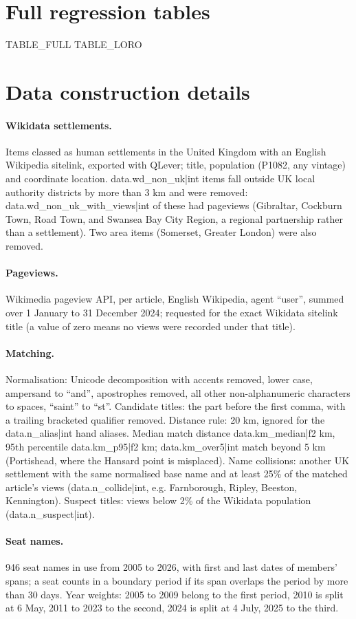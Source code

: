 \documentclass[11pt,a4paper]{article}
\begin{document}
\appendix
\section{Full regression tables}
{{TABLE_FULL}}
{{TABLE_LORO}}
\section{Data construction details}
\label{app:data}
\paragraph{Wikidata settlements.} Items classed as human settlements in the United Kingdom with an English Wikipedia sitelink, exported with QLever; title, population (P1082, any vintage) and coordinate location. {{data.wd_non_uk|int}} items fall outside UK local authority districts by more than 3 km and were removed: {{data.wd_non_uk_with_views|int}} of these had pageviews (Gibraltar, Cockburn Town, Road Town, and Swansea Bay City Region, a regional partnership rather than a settlement). Two area items (Somerset, Greater London) were also removed.
\paragraph{Pageviews.} Wikimedia pageview API, per article, English Wikipedia, agent ``user'', summed over 1 January to 31 December 2024; requested for the exact Wikidata sitelink title (a value of zero means no views were recorded under that title).
\paragraph{Matching.} Normalisation: Unicode decomposition with accents removed, lower case, ampersand to ``and'', apostrophes removed, all other non-alphanumeric characters to spaces, ``saint'' to ``st''. Candidate titles: the part before the first comma, with a trailing bracketed qualifier removed. Distance rule: 20 km, ignored for the {{data.n_alias|int}} hand aliases. Median match distance {{data.km_median|f2}} km, 95th percentile {{data.km_p95|f2}} km; {{data.km_over5|int}} match beyond 5 km (Portishead, where the Hansard point is misplaced). Name collisions: another UK settlement with the same normalised base name and at least 25\% of the matched article's views ({{data.n_collide|int}}, e.g. Farnborough, Ripley, Beeston, Kennington). Suspect titles: views below 2\% of the Wikidata population ({{data.n_suspect|int}}).
\paragraph{Seat names.} 946 seat names in use from 2005 to 2026, with first and last dates of members' spans; a seat counts in a boundary period if its span overlaps the period by more than 30 days. Year weights: 2005 to 2009 belong to the first period, 2010 is split at 6 May, 2011 to 2023 to the second, 2024 is split at 4 July, 2025 to the third.
\end{document}
